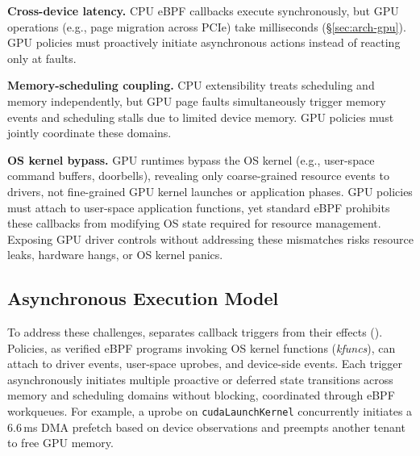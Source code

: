 \textbf{Cross-device latency.}
CPU eBPF callbacks execute synchronously, but GPU operations (e.g., page migration across PCIe) take milliseconds (\S\ref{sec:arch-gpu}).
GPU policies must proactively initiate asynchronous actions instead of reacting only at faults.

\textbf{Memory-scheduling coupling.}
CPU extensibility treats scheduling and memory independently, but GPU page faults simultaneously trigger memory events and scheduling stalls due to limited device memory.
GPU policies must jointly coordinate these domains.

\textbf{OS kernel bypass.}
GPU runtimes bypass the OS kernel (e.g., user-space command buffers, doorbells), revealing only coarse-grained resource events to drivers, not fine-grained GPU kernel launches or application phases.
GPU policies must attach to user-space application functions, yet standard eBPF prohibits these callbacks from modifying OS state required for resource management.
Exposing GPU driver controls without addressing these mismatches risks resource leaks, hardware hangs, or OS kernel panics.

\subsection{Asynchronous Execution Model}
\label{sec:exec-model}

To address these challenges, \sys{} separates callback triggers from their effects ().
Policies, as verified eBPF programs invoking OS kernel functions (\emph{kfuncs}), can attach to driver events, user-space uprobes, and device-side events.
Each trigger asynchronously initiates multiple proactive or deferred state transitions across memory and scheduling domains without blocking, coordinated through eBPF workqueues.
For example, a uprobe on \texttt{cudaLaunchKernel} concurrently initiates a 6.6\,ms DMA prefetch based on device observations and preempts another tenant to free GPU memory.

